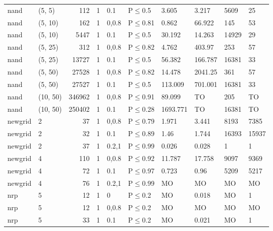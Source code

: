 \begin{longtable}{llrrllllll}
 nand          & (5, 5)   &    	112 & 1 & 0.1   & P$\leq$0.5   & 3.605    & 3.217    & 5609    & 25      \\
 nand          & (5, 10)  &    	162 & 1 & 0,0.8 & P$\leq$0.81  & 0.862    & 66.922   & 145     & 53      \\
 nand          & (5, 10)  &   	5447 & 1 & 0.1   & P$\leq$0.5   & 30.192   & 14.263   & 14929   & 29      \\
 nand          & (5, 25)  &    	312 & 1 & 0,0.8 & P$\leq$0.82  & 4.762    & 403.97   & 253     & 57      \\
 nand          & (5, 25)  &  	13727 & 1 & 0.1   & P$\leq$0.5   & 56.382   & 166.787  & 16381   & 33      \\
 nand          & (5, 50)  &  	27528 & 1 & 0,0.8 & P$\leq$0.82  & 14.478   & 2041.25  & 361     & 57      \\
 nand          & (5, 50)  &  	27527 & 1 & 0.1   & P$\leq$0.5   & 113.009  & 701.001  & 16381   & 33      \\
 nand          & (10, 50) & 	346962 & 1 & 0,0.8 & P$\leq$0.91  & 89.099   & TO       & 205     & TO      \\
 nand          & (10, 50) & 	250402 & 1 & 0.1   & P$\leq$0.28  & 1693.771 & TO       & 16381   & TO      \\
 newgrid       & 2        &     	37 & 1 & 0,0.8 & P$\leq$0.79  & 1.971    & 3.441    & 8193    & 7385    \\
 newgrid       & 2        &     	32 & 1 & 0.1   & P$\leq$0.89  & 1.46     & 1.744    & 16393   & 15937   \\
 newgrid       & 2        &     	37 & 1 & 0.2,1 & P$\leq$0.99  & 0.026    & 0.028    & 1       & 1       \\
 newgrid       & 4        &    	110 & 1 & 0,0.8 & P$\leq$0.92  & 11.787   & 17.758   & 9097    & 9369    \\
 newgrid       & 4        &     	72 & 1 & 0.1   & P$\leq$0.97  & 0.723    & 0.96     & 5209    & 5217    \\
 newgrid       & 4        &     	76 & 1 & 0.2,1 & P$\leq$0.99  & MO       & MO       & MO      & MO      \\
 nrp           & 5        &     	12 & 1 & 0     & P$\leq$0.2   & MO       & 0.018    & MO      & 1       \\
 nrp           & 5        &     	12 & 1 & 0,0.8 & P$\leq$0.2   & MO       & MO       & MO      & MO      \\
 nrp           & 5        &     	33 & 1 & 0.1   & P$\leq$0.2   & MO       & 0.021    & MO      & 1       \\

\end{longtable}
